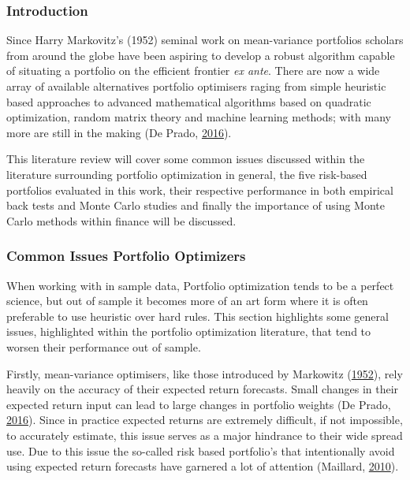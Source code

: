 \documentclass[11pt,preprint, authoryear]{elsarticle}
\numberwithin{equation}{section}
\numberwithin{figure}{section}
\numberwithin{table}{section}
\begin{document}
\hypertarget{introduction-1}{%
\subsubsection{Introduction}\label{introduction-1}}

Since Harry Markovitz's (1952) seminal work on mean-variance portfolios
scholars from around the globe have been aspiring to develop a robust
algorithm capable of situating a portfolio on the efficient frontier
\emph{ex ante}. There are now a wide array of available alternatives
portfolio optimisers raging from simple heuristic based approaches to
advanced mathematical algorithms based on quadratic optimization, random
matrix theory and machine learning methods; with many more are still in
the making (De Prado, \protect\hyperlink{ref-lopez}{2016}).

This literature review will cover some common issues discussed within
the literature surrounding portfolio optimization in general, the five
risk-based portfolios evaluated in this work, their respective
performance in both empirical back tests and Monte Carlo studies and
finally the importance of using Monte Carlo methods within finance will
be discussed.

\hypertarget{common-issues-portfolio-optimizers}{%
\subsubsection{Common Issues Portfolio
Optimizers}\label{common-issues-portfolio-optimizers}}

When working with in sample data, Portfolio optimization tends to be a
perfect science, but out of sample it becomes more of an art form where
it is often preferable to use heuristic over hard rules. This section
highlights some general issues, highlighted within the portfolio
optimization literature, that tend to worsen their performance out of
sample.

Firstly, mean-variance optimisers, like those introduced by Markowitz
(\protect\hyperlink{ref-markowitz}{1952}), rely heavily on the accuracy
of their expected return forecasts. Small changes in their expected
return input can lead to large changes in portfolio weights (De Prado,
\protect\hyperlink{ref-lopez}{2016}). Since in practice expected returns
are extremely difficult, if not impossible, to accurately estimate, this
issue serves as a major hindrance to their wide spread use. Due to this
issue the so-called risk based portfolio's that intentionally avoid
using expected return forecasts have garnered a lot of attention
(Maillard, \protect\hyperlink{ref-maillard2010}{2010}).
\end{document}
